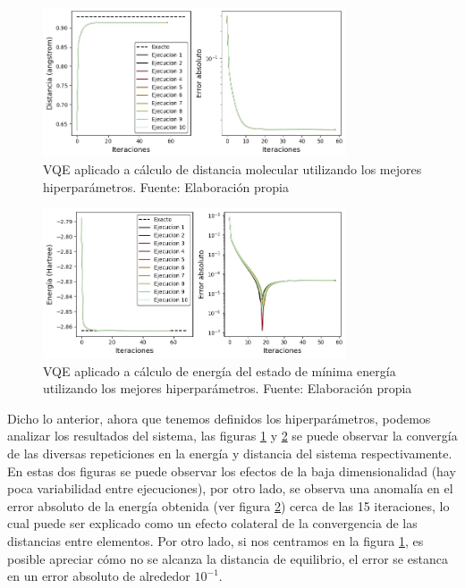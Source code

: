 \begin{figure}[H]
\centering
\includegraphics[width=0.8\textwidth]{figures/S4/moleculas/estructuradistancia.png}
\caption{\label{fig:43} VQE aplicado a cálculo de distancia molecular utilizando los mejores hiperparámetros. Fuente: Elaboración propia}
\end{figure}

\begin{figure}[H]
\centering
\includegraphics[width=0.8\textwidth]{figures/S4/moleculas/estructuraenergia.png}
\caption{\label{fig:44} VQE aplicado a cálculo de energía del estado de mínima energía utilizando los mejores hiperparámetros. Fuente: Elaboración propia}
\end{figure}


Dicho lo anterior, ahora que tenemos definidos los hiperparámetros, podemos analizar los resultados del sistema, las figuras \ref{fig:43} y \ref{fig:44} se puede observar la convergía de las diversas repeticiones en la energía y distancia del sistema respectivamente. En estas dos figuras se puede observar los efectos de la baja dimensionalidad (hay poca variabilidad entre ejecuciones), por otro lado, se observa una anomalía en el error absoluto de la energía obtenida (ver figura \ref{fig:44}) cerca de las 15 iteraciones, lo cual puede ser explicado como un efecto colateral de la convergencia de las distancias entre elementos. Por otro lado, si nos centramos en la figura \ref{fig:43}, es posible apreciar cómo no se alcanza la distancia de equilibrio, el error se estanca en un error absoluto de alrededor $10^{-1}$. 


